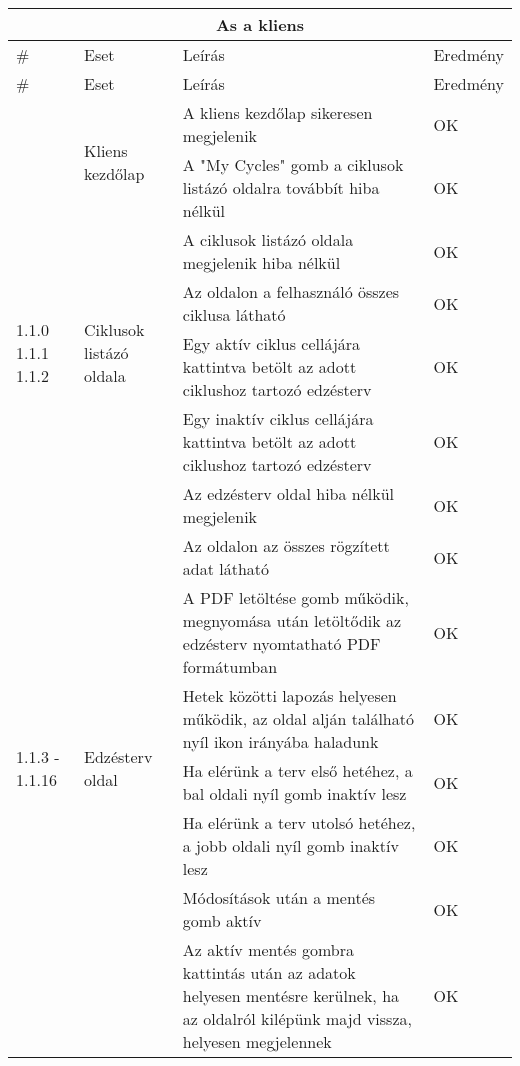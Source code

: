 \begin{center}
	\begin{longtable}{ | p{} | p{} | p{} | p{} | }
			
			\hline
			\multicolumn{4}{|c|}{\textbf{As a kliens}}
			\\ \hline
			
			\# & Eset & Leírás & Eredmény
			\\ \hline \hline
			\endfirsthead %
			
			\hline
			\# & Eset & Leírás & Eredmény
			\\ \hline \hline
			\endhead %
			
			\hline
			\endfoot %
			
			\endlastfoot %
			

			\multirow{2}{=}{1.0.1 1.1.0} 
			& \multirow{2}{=}{Kliens kezdőlap} 
			& A kliens kezdőlap sikeresen megjelenik 
			& OK \\
			\cline{3-4}
			& & A "My Cycles" gomb a ciklusok listázó oldalra továbbít hiba nélkül 
			& OK \\
			\hline

			\multirow{4}{=}{1.1.0 1.1.1 1.1.2} 
			& \multirow{4}{=}{Ciklusok listázó oldala} 
			& A ciklusok listázó oldala megjelenik hiba nélkül 
			& OK \\
			\cline{3-4}
			& & Az oldalon a felhasználó összes ciklusa látható 
			& OK \\
			\cline{3-4}
			& & Egy aktív ciklus cellájára kattintva betölt az adott ciklushoz tartozó edzésterv 
			& OK \\
			\cline{3-4}
			& & Egy inaktív ciklus cellájára kattintva betölt az adott ciklushoz tartozó edzésterv
			& OK \\
			\hline

			\multirow{8}{=}{1.1.3 - 1.1.16} 
			& \multirow{8}{=}{Edzésterv oldal} 
			& Az edzésterv oldal hiba nélkül megjelenik 
			& OK \\
			\cline{3-4}
			& & Az oldalon az összes rögzített adat látható
			& OK \\
			\cline{3-4}
			& & A PDF letöltése gomb működik, megnyomása után letöltődik az edzésterv nyomtatható PDF formátumban 
			& OK \\
			\cline{3-4}
			& & Hetek közötti lapozás helyesen működik, az oldal alján található nyíl ikon irányába haladunk 
			& OK \\
			\cline{3-4}
			& & Ha elérünk a terv első hetéhez, a bal oldali nyíl gomb inaktív lesz
			& OK \\
			\cline{3-4}
			& & Ha elérünk a terv utolsó hetéhez, a jobb oldali nyíl gomb inaktív lesz
			& OK \\
			\cline{3-4}
			& & Módosítások után a mentés gomb aktív
			& OK \\
			\cline{3-4}
			& & Az aktív mentés gombra kattintás után az adatok helyesen mentésre kerülnek, ha az oldalról kilépünk majd vissza, helyesen megjelennek
			& OK \\
			\hline


\end{longtable}
\end{center}
